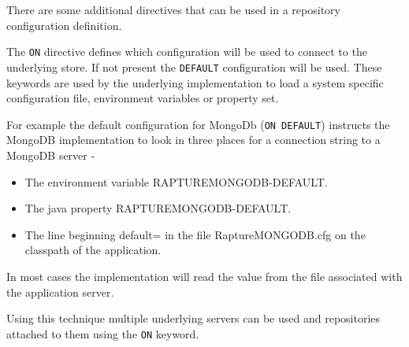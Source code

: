 There are some additional directives that can be used in a repository configuration definition.

The \verb+ON+ directive defines which configuration will be used to connect to the underlying store. If
not present the \verb+DEFAULT+ configuration will be used. These keywords are used by the underlying
implementation to load a system specific configuration file, environment variables or property set.

For example the default configuration for MongoDb (\verb+ON DEFAULT+) instructs the MongoDB implementation
to look in three places for a connection string to a MongoDB server -

\begin{itemize}
\item{The environment variable RAPTUREMONGODB-DEFAULT.}
\item{The java property RAPTUREMONGODB-DEFAULT.}
\item{The line beginning default= in the file RaptureMONGODB.cfg on the classpath of the application.}
\end{itemize}

In most cases the implementation will read the value from the file associated with the application server.

Using this technique multiple underlying servers can be used and repositories attached to them using the
\verb+ON+ keyword.
